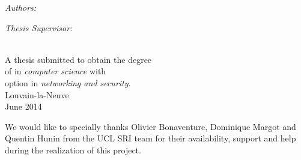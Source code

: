 \documentclass[11pt, a4paper, oneside]{Packages/Thesis}
\begin{document}
\begin{titlepage}
\begin{center}
\begin{minipage}{0.4\textwidth}
\begin{flushleft} \large
\emph{Authors:}\\
{\authornames} %
\end{flushleft}
\end{minipage}
\begin{minipage}{0.4\textwidth}
\begin{flushright} \large
\emph{Thesis Supervisor:} \\
{\supname} %
\end{flushright}
\end{minipage}\\[5cm]



 
\large A thesis submitted to obtain the degree\\of \textit{\degreename} in \textit{computer science} with\\option in \textit{networking and security}.\\[1.5cm] %


 
{\large Louvain-la-Neuve\\ June 2014}\\[4cm] %
 
\vfill
\end{center}

\end{titlepage}

\clearpage
\pagestyle{empty} %

\null\vfill %

We would like to specially thanks Olivier Bonaventure, Dominique Margot and Quentin Hunin from the UCL SRI team  for their availability, support and help during the realization of this project.


\vfill\vfill\vfill\vfill\vfill\vfill\null %
\end{document}
